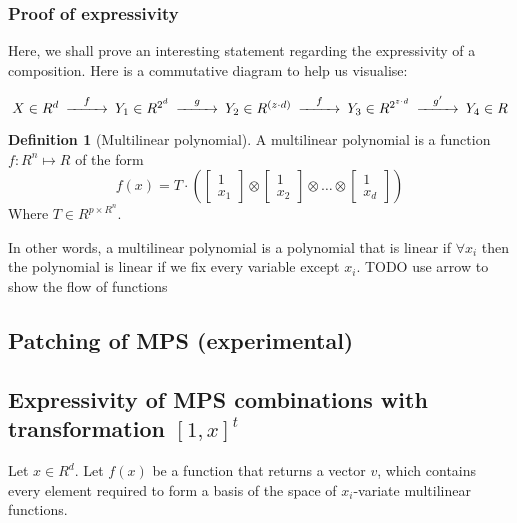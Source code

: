 \documentclass[11pt]{article}
\theoremstyle{definition}
\newtheorem{definition}{Definition}[section]
\theoremstyle{definition}
\begin{document}
\subsubsection{Proof of expressivity}
Here, we shall prove an interesting statement regarding the expressivity 
of a composition. Here is a commutative diagram to help us visualise:

\begin{equation}
    \begin{CD}
        @. X \in R^d 
        @>f>> Y_1 \in R^{2^d}
        @>g>> Y_2 \in R^{(z \cdot d)} 
        @>f>> Y_3 \in R^{2^{z \cdot d}}
        @>g'>> Y_4 \in R
    \end{CD}
\end{equation}


\begin{definition}[Multilinear polynomial]
    A multilinear polynomial is a function $f: R^n \mapsto R$ of the form
    \begin{equation}
        f(x) = T \cdot \left( 
            \begin{bmatrix} 1 \\ x_1 \end{bmatrix} \otimes 
            \begin{bmatrix} 1 \\ x_2 \end{bmatrix} \otimes 
            \dots \otimes 
            \begin{bmatrix} 1 \\ x_d \end{bmatrix}
        \right)
    \end{equation}
    Where $T \in R^{p \times R^n }$. 
\end{definition}
In other words, a multilinear polynomial is a polynomial that is linear if  $\forall x_i$
then the polynomial is linear if we fix every variable except $x_i$.
TODO use arrow to show the flow of functions
\subsection{Patching of MPS (experimental)}


\subsection{Expressivity of MPS combinations with transformation $[1,x]^t$}
Let $x \in R^d$.
Let $f(x)$ be a function that returns a vector $v$, which contains every
element required to form a basis of the space of $x_i$-variate multilinear functions.
\end{document}
